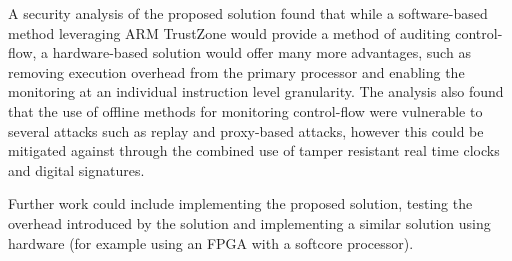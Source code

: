 A security analysis of the proposed solution found that while a software-based method leveraging ARM TrustZone would provide a method of auditing control-flow, a hardware-based solution would offer many more advantages, such as removing execution overhead from the primary processor and enabling the monitoring at an individual instruction level granularity. The analysis also found that the use of offline methods for monitoring control-flow were vulnerable to several attacks such as replay and proxy-based attacks, however this could be mitigated against through the combined use of tamper resistant real time clocks and digital signatures.

Further work could include implementing the proposed solution, testing the overhead introduced by the solution and implementing a similar solution using hardware (for example using an FPGA with a softcore processor).

